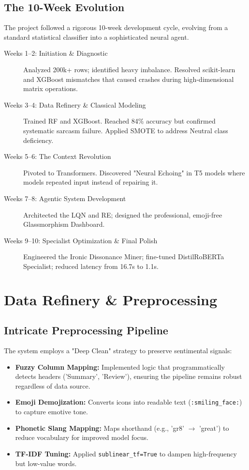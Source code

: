 \documentclass[11pt,oneside]{scrbook}
\begin{document}
\section{The 10-Week Evolution}
The project followed a rigorous 10-week development cycle, evolving from a standard statistical classifier into a sophisticated neural agent.
\begin{description}
    \item[Weeks 1--2: Initiation \& Diagnostic] Analyzed 200k+ rows; identified heavy imbalance. Resolved scikit-learn and XGBoost mismatches that caused crashes during high-dimensional matrix operations.
    \item[Weeks 3--4: Data Refinery \& Classical Modeling] Trained RF and XGBoost. Reached 84\% accuracy but confirmed systematic sarcasm failure. Applied SMOTE to address Neutral class deficiency.
    \item[Weeks 5--6: The Context Revolution] Pivoted to Transformers. Discovered "Neural Echoing" in T5 models where models repeated input instead of repairing it.
    \item[Weeks 7--8: Agentic System Development] Architected the LQN and RE; designed the professional, emoji-free Glassmorphism Dashboard.
    \item[Weeks 9--10: Specialist Optimization \& Final Polish] Engineered the Ironic Dissonance Miner; fine-tuned DistilRoBERTa Specialist; reduced latency from 16.7s to 1.1s.
\end{description}

\chapter{Data Refinery \& Preprocessing}

\section{Intricate Preprocessing Pipeline}
The system employs a "Deep Clean" strategy to preserve sentimental signals:
\begin{itemize}
    \item \textbf{Fuzzy Column Mapping:} Implemented logic that programmatically detects headers ('Summary', 'Review'), ensuring the pipeline remains robust regardless of data source.
    \item \textbf{Emoji Demojization:} Converts icons into readable text (\texttt{:smiling\_face:}) to capture emotive tone.
    \item \textbf{Phonetic Slang Mapping:} Maps shorthand (e.g., 'gr8' $\to$ 'great') to reduce vocabulary for improved model focus.
    \item \textbf{TF-IDF Tuning:} Applied \texttt{sublinear\_tf=True} to dampen high-frequency but low-value words.
\end{itemize}
\end{document}
